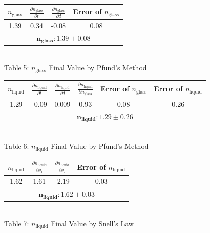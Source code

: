 \begin{center}
    \centering
    \begin{tabular}{|c|c|c|c|}
    \hline
        $n_\text{glass}$ & $\frac{\partial n_\text{glass}}{\partial t}$ & $\frac{\partial n_\text{glass}}{\partial d}$ & Error of $n_\text{glass}$ \\ \hline
        1.39 & 0.34 & -0.08 & 0.08 \\ \hline
        \multicolumn{4}{|c|}{$\bm{n_\textbf{glass}: 1.39\pm0.08}$}\\\hline
    \end{tabular}
    \vspace{3mm}
    \\ Table 5: $n_\text{glass}$ Final Value by Pfund's Method\\
    \vspace{5mm}
    \centering
    \begin{tabular}{|c|c|c|c|c|c|}
    \hline
        $n_\text{liquid}$ & $\frac{\partial n_\text{liquid}}{\partial t}$ & $\frac{\partial n_\text{liquid}}{\partial d}$ & $\frac{\partial n_\text{liquid}}{\partial n_{\text{glass}}}$ & Error of $n_\text{glass}$ & Error of $n_\text{liquid}$ \\ \hline
        1.29 & -0.09 & 0.009 & 0.93 & 0.08 & 0.26 \\ \hline
        \multicolumn{6}{|c|}{$\bm{n_\textbf{liquid}: 1.29\pm0.26}$}\\\hline
    \end{tabular} 
    \vspace{3mm}
    \\ Table 6: $n_\text{liquid}$ Final Value by Pfund's Method\\
    \vspace{5mm} 
    \centering
    \begin{tabular}{|c|c|c|c|}
    \hline
        $n_\text{liquid}$ & $\frac{\partial n_\text{liquid}}{\partial \theta_1}$ & $\frac{\partial n_\text{liquid}}{\partial \theta_2}$  & Error of $n_\text{liquid}$ \\ \hline
        1.62 & 1.61 & -2.19 & 0.03  \\ \hline
        \multicolumn{4}{|c|}{$\bm{n_\textbf{liquid}: 1.62\pm0.03}$}\\\hline
    \end{tabular} 
    \vspace{3mm}
    \\ Table 7: $n_\text{liquid}$ Final Value by Snell's Law\\
    \vspace{5mm}

\end{center}
